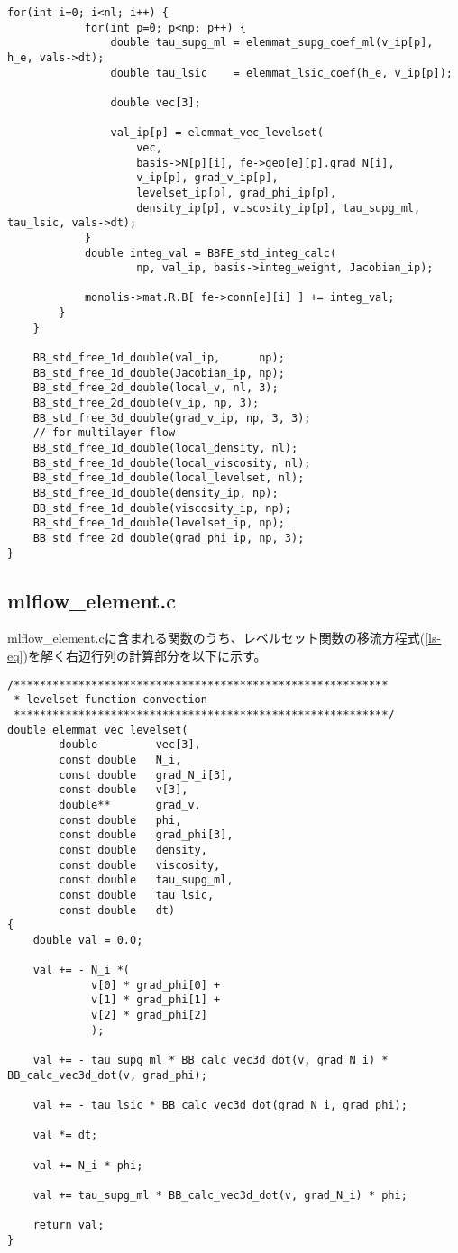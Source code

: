 \begin{lstlisting}[caption = mlflow\_fs.cの中のレベルセット関数の右辺ベクトルを計算する関数]
		for(int i=0; i<nl; i++) {
			for(int p=0; p<np; p++) {
				double tau_supg_ml = elemmat_supg_coef_ml(v_ip[p], h_e, vals->dt);
				double tau_lsic    = elemmat_lsic_coef(h_e, v_ip[p]);

				double vec[3];
				
				val_ip[p] = elemmat_vec_levelset(
					vec, 
					basis->N[p][i], fe->geo[e][p].grad_N[i], 
					v_ip[p], grad_v_ip[p],
					levelset_ip[p], grad_phi_ip[p],
					density_ip[p], viscosity_ip[p], tau_supg_ml, tau_lsic, vals->dt);
			}
			double integ_val = BBFE_std_integ_calc(
					np, val_ip, basis->integ_weight, Jacobian_ip);

			monolis->mat.R.B[ fe->conn[e][i] ] += integ_val;
		}
	}
	
	BB_std_free_1d_double(val_ip,      np);
	BB_std_free_1d_double(Jacobian_ip, np);
	BB_std_free_2d_double(local_v, nl, 3);
	BB_std_free_2d_double(v_ip, np, 3);
	BB_std_free_3d_double(grad_v_ip, np, 3, 3);
	// for multilayer flow
	BB_std_free_1d_double(local_density, nl);
	BB_std_free_1d_double(local_viscosity, nl);
	BB_std_free_1d_double(local_levelset, nl);
	BB_std_free_1d_double(density_ip, np);
	BB_std_free_1d_double(viscosity_ip, np);
	BB_std_free_1d_double(levelset_ip, np);
	BB_std_free_2d_double(grad_phi_ip, np, 3);
}
\end{lstlisting}

\subsection{mlflow\_element.c}

mlflow\_element.cに含まれる関数のうち、レベルセット関数の移流方程式(\ref{ls-eq})を解く右辺行列の計算部分を以下に示す。
\begin{lstlisting}[caption = mlflow\_element.cのレベルセット関数の計算の右辺ベクトルの計算]
/**********************************************************
 * levelset function convection
 **********************************************************/
double elemmat_vec_levelset(
		double         vec[3],
		const double   N_i,
		const double   grad_N_i[3],
		const double   v[3],
		double**       grad_v,
		const double   phi,
		const double   grad_phi[3],
		const double   density,
		const double   viscosity,
		const double   tau_supg_ml,
		const double   tau_lsic,
		const double   dt)
{
	double val = 0.0;

	val += - N_i *( 
			 v[0] * grad_phi[0] + 
			 v[1] * grad_phi[1] + 
			 v[2] * grad_phi[2] 
			 );

	val += - tau_supg_ml * BB_calc_vec3d_dot(v, grad_N_i) * BB_calc_vec3d_dot(v, grad_phi);

   	val += - tau_lsic * BB_calc_vec3d_dot(grad_N_i, grad_phi);

	val *= dt;

	val += N_i * phi;

	val += tau_supg_ml * BB_calc_vec3d_dot(v, grad_N_i) * phi;

	return val;
}
\end{lstlisting}

